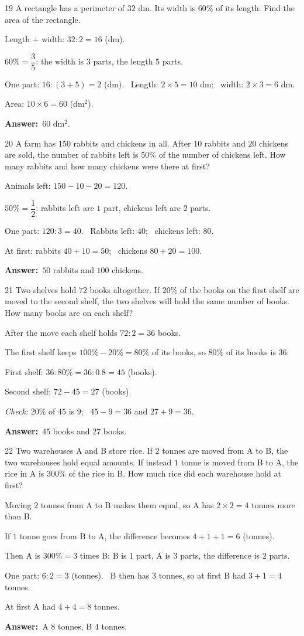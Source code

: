 \documentclass[11pt]{article}
\newif\ifsol \solfalse
\providecommand{\AnsWord}{Đáp số}
\newcommand{\dapso}[1]{\par\textbf{\AnsWord:}\ #1}
\newcommand{\probsol}[1]{%
  \begin{lrbox}{\solmeasure}\begin{minipage}{\dimexpr\linewidth-24pt\relax}#1\end{minipage}\end{lrbox}%
  \ifsol
    \begin{solbox}#1\end{solbox}%
  \else
    \setlength{\solht}{\dimexpr\ht\solmeasure+\dp\solmeasure+0.85cm\relax}%
    \ifdim\solht<1.35cm\setlength{\solht}{1.35cm}\fi
    \begin{tcolorbox}[colback=white,colframe=Line,boxrule=0.8pt,arc=5pt,
      left=8pt,right=8pt,top=4pt,bottom=4pt,height=\solht]{\footnotesize\color{Slate}\itshape\WorkWord}\end{tcolorbox}%
  \fi}
\newcommand{\gap}{\vspace{0.3cm}}
\def\WorkWord{Your work:}
\def\AnsWord{Answer}
\begin{document}
\gap
\begin{probbox}{19}{\relax}
A rectangle has a perimeter of $32$ dm. Its width is $60\%$ of its length. Find the area of the rectangle.
\end{probbox}
\probsol{
Length $+$ width: $32:2=16$ (dm).\par
$60\%=\dfrac35$: the width is $3$ parts, the length $5$ parts.\par
One part: $16:(3+5)=2$ (dm). \ Length: $2\times5=10$ dm; \ width: $2\times3=6$ dm.\par
Area: $10\times6=60$ (dm$^2$).
\dapso{$60$ dm$^2$.}}
\gap
\begin{probbox}{20}{\relax}
A farm has $150$ rabbits and chickens in all. After $10$ rabbits and $20$ chickens are sold, the number of rabbits left is $50\%$ of the number of chickens left. How many rabbits and how many chickens were there at first?
\end{probbox}
\probsol{
Animals left: $150-10-20=120$.\par
$50\%=\dfrac12$: rabbits left are $1$ part, chickens left are $2$ parts.\par
One part: $120:3=40$. \ Rabbits left: $40$; \ chickens left: $80$.\par
At first: rabbits $40+10=50$; \ chickens $80+20=100$.
\dapso{$50$ rabbits and $100$ chickens.}}
\gap
\begin{probbox}{21}{\relax}
Two shelves hold $72$ books altogether. If $20\%$ of the books on the first shelf are moved to the second shelf, the two shelves will hold the same number of books. How many books are on each shelf?
\end{probbox}
\probsol{
After the move each shelf holds $72:2=36$ books.\par
The first shelf keeps $100\%-20\%=80\%$ of its books, so $80\%$ of its books is $36$.\par
First shelf: $36:80\%=36:0.8=45$ (books).\par
Second shelf: $72-45=27$ (books).\par
\emph{Check:} $20\%$ of $45$ is $9$; \ $45-9=36$ and $27+9=36$.
\dapso{$45$ books and $27$ books.}}
\gap
\begin{probbox}{22}{\relax}
Two warehouses A and B store rice. If $2$ tonnes are moved from A to B, the two warehouses hold equal amounts. If instead $1$ tonne is moved from B to A, the rice in A is $300\%$ of the rice in B. How much rice did each warehouse hold at first?
\end{probbox}
\probsol{
Moving $2$ tonnes from A to B makes them equal, so A has $2\times2=4$ tonnes more than B.\par
If $1$ tonne goes from B to A, the difference becomes $4+1+1=6$ (tonnes).\par
Then A is $300\%=3$ times B: B is $1$ part, A is $3$ parts, the difference is $2$ parts.\par
One part: $6:2=3$ (tonnes). \ B then has $3$ tonnes, so at first B had $3+1=4$ tonnes.\par
At first A had $4+4=8$ tonnes.
\dapso{A $8$ tonnes, B $4$ tonnes.}}
\end{document}
